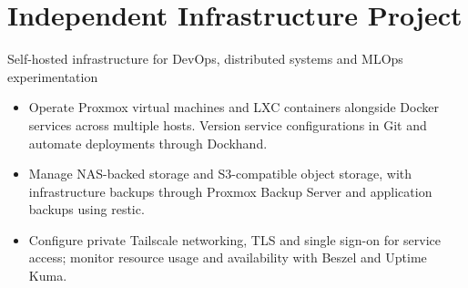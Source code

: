 \section{Independent Infrastructure Project}

  {Self-hosted infrastructure for DevOps, distributed systems and MLOps experimentation}
\begin{itemize}
  \item Operate Proxmox virtual machines and LXC containers alongside Docker
    services across multiple hosts. Version service configurations in Git and
    automate deployments through Dockhand.
  \item Manage NAS-backed storage and S3-compatible object storage, with
    infrastructure backups through Proxmox Backup Server and application
    backups using restic.
  \item Configure private Tailscale networking, TLS and single sign-on for
    service access; monitor resource usage and availability with Beszel and
    Uptime Kuma.
\end{itemize}
